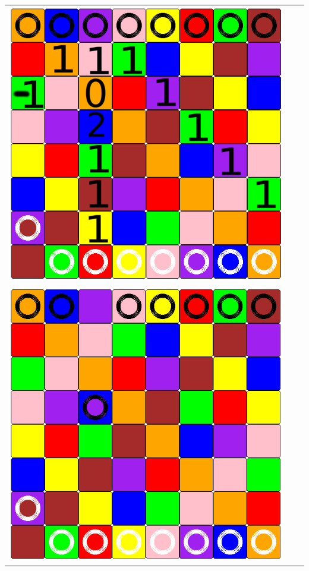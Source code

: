\documentclass[a4paper, 11pt]{beamer}
\begin{document}
\begin{frame}
\begin{center}
\begin{tabular}{c c c}
     \pause
    \includegraphics[scale = 0.12]{val_3.png} \\
    \pause
    \includegraphics[scale = 0.12]{val_4.png} &
    \pause

\end{tabular}
\end{center}
\end{frame}
\end{document}
